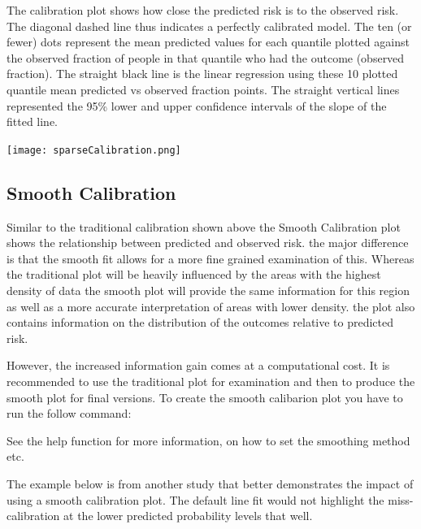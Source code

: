 \documentclass[]{article}
\newenvironment{Shaded}{\begin{snugshade}}{\end{snugshade}}
\newcommand{\KeywordTok}[1]{\textcolor[rgb]{0.13,0.29,0.53}{\textbf{#1}}}
\newcommand{\OperatorTok}[1]{\textcolor[rgb]{0.81,0.36,0.00}{\textbf{#1}}}
\newcommand{\NormalTok}[1]{#1}
\begin{document}
The calibration plot shows how close the predicted risk is to the
observed risk. The diagonal dashed line thus indicates a perfectly
calibrated model. The ten (or fewer) dots represent the mean predicted
values for each quantile plotted against the observed fraction of people
in that quantile who had the outcome (observed fraction). The straight
black line is the linear regression using these 10 plotted quantile mean
predicted vs observed fraction points. The straight vertical lines
represented the 95\% lower and upper confidence intervals of the slope
of the fitted line.

\texttt{[image: sparseCalibration.png]}

\newpage

\subsection{Smooth Calibration}\label{smooth-calibration}

Similar to the traditional calibration shown above the Smooth
Calibration plot shows the relationship between predicted and observed
risk. the major difference is that the smooth fit allows for a more fine
grained examination of this. Whereas the traditional plot will be
heavily influenced by the areas with the highest density of data the
smooth plot will provide the same information for this region as well as
a more accurate interpretation of areas with lower density. the plot
also contains information on the distribution of the outcomes relative
to predicted risk.

However, the increased information gain comes at a computational cost.
It is recommended to use the traditional plot for examination and then
to produce the smooth plot for final versions. To create the smooth
calibarion plot you have to run the follow command:

\begin{Shaded}
\end{Shaded}

See the help function for more information, on how to set the smoothing
method etc.

The example below is from another study that better demonstrates the
impact of using a smooth calibration plot. The default line fit would
not highlight the miss-calibration at the lower predicted probability
levels that well.
\end{document}
